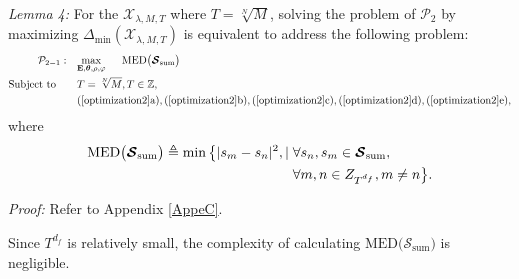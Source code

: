 \documentclass[journal]{IEEEtran}
\begin{document}
\textit{Lemma 4:}  For the  $ \boldsymbol {\mathcal X}_{\lambda, M, T}$ where $T= {\sqrt[N]{M}}$, solving the problem of $ \mathcal {P}_2$ by 
maximizing  $\Delta_{\min}\left( {   \boldsymbol {\mathcal X}_{\lambda,M,T}}\right) $ is equivalent to address  the following problem: 
\begin{equation}
\label{optimization3}
 \small
\begin{aligned}
\mathcal {P}_{2-1}: \quad   & \underset{\mathbf{E},\boldsymbol{\theta }, \rho,\varphi  }{\mathop{\max }}\quad    \; \; \text{MED} \big ({\boldsymbol{\mathcal S}}_{\text{sum}}  \big)  \\
\text {Subject to}  \quad \quad    &  T= {\sqrt[N]{M}}, T \in \mathbb Z, \\ & (\ref{optimization2}\text{a}),(\ref{optimization2}\text{b}),(\ref{optimization2}\text{c}),(\ref{optimization2}\text{d}),(\ref{optimization2}\text{e}),
\end{aligned}
\end{equation}
where
 \begin{equation} 
 \small
 \label{delta1}
 \begin{aligned}
\text{MED} \big ({\boldsymbol{\mathcal S}}_{\text{sum}}  \big)  \triangleq    \min \big \{   \vert  {s}_{m} -  {s}_{n} \vert ^2,  | \; & \forall   {{{s}}_{n}},{{{s}}_{m}}\in \boldsymbol {\mathcal S}_{\text{sum}},     \\
 &    {\forall m,n\in {{Z}_{{{T}^{d_f}}}},m\ne n } \big\}.
 \end{aligned}
  \end{equation}
  
\textit{Proof: } Refer to  Appendix \ref{AppeC}.

Since ${{T}^{d_f}}$ is relatively small, the complexity of calculating  $\text{MED} \big ({\boldsymbol{\mathcal S}_{\text{sum}} } \big) $ is negligible.


 
\end{document}
